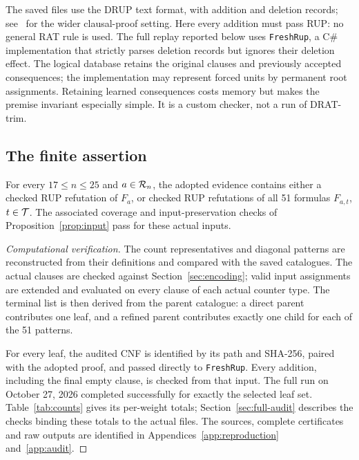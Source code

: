 The saved files use the DRUP text format, with addition and deletion
records; see~\cite{drat} for the wider clausal-proof setting. Here every
addition must pass RUP: no general RAT rule is used. The full replay
reported below uses \texttt{FreshRup}, a C\# implementation that strictly
parses deletion records but ignores their deletion effect. The logical
database retains the original clauses and previously accepted
consequences; the implementation may represent forced units by permanent
root assignments. Retaining learned consequences costs memory but makes
the premise invariant especially simple. It is a custom checker, not a
run of DRAT-trim.

\subsection{The finite assertion}
\begin{proposition}\label{prop:finite}
For every $17\leq n\leq25$ and $a\in\mathcal{R}_n$, the adopted evidence
contains either a checked RUP refutation of $F_a$, or checked RUP
refutations of all 51 formulas $F_{a,t}$, $t\in\mathcal{T}$. The associated
coverage and input-preservation checks of
Proposition~\ref{prop:input} pass for these actual inputs.
\end{proposition}
\begin{proof}[Computational verification]
The count representatives and diagonal patterns are reconstructed from
their definitions and compared with the saved catalogues. The actual
clauses are checked against Section~\ref{sec:encoding}; valid input
assignments are extended and evaluated on every clause of each actual
counter type. The terminal list is then derived from the parent catalogue:
a direct parent contributes one leaf, and a refined parent contributes
exactly one child for each of the 51 patterns.

For every leaf, the audited CNF is identified by its path and SHA-256,
paired with the adopted proof, and passed directly to \texttt{FreshRup}.
Every addition, including the final empty clause, is checked from that
input. The full run on October 27, 2026 completed successfully for exactly
the selected leaf set. Table~\ref{tab:counts} gives its per-weight totals;
Section~\ref{sec:full-audit} describes the checks binding these totals to
the actual files. The sources, complete certificates and raw outputs are
identified in Appendices~\ref{app:reproduction} and~\ref{app:audit}.
\end{proof}

